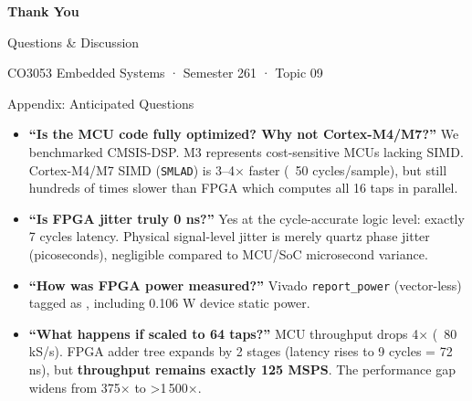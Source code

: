 \begin{frame}[plain]
\vfill\centering
{\Huge\bfseries Thank You}\par\bigskip
{\Large Questions \& Discussion}\par\bigskip
{\color{cInk2}CO3053 Embedded Systems · Semester 261 · Topic 09}
\vfill
\end{frame}

\appendix
\begin{frame}{Appendix: Anticipated Questions}
\footnotesize
\begin{itemize}\setlength{\itemsep}{2pt}
\item \textbf{``Is the MCU code fully optimized? Why not Cortex-M4/M7?''} We benchmarked CMSIS-DSP. M3 represents cost-sensitive MCUs lacking SIMD. Cortex-M4/M7 SIMD (\texttt{SMLAD}) is 3–4× faster (~50 cycles/sample), but still hundreds of times slower than FPGA which computes all 16 taps in parallel.
\item \textbf{``Is FPGA jitter truly 0 ns?''} Yes at the cycle-accurate logic level: exactly 7 cycles latency. Physical signal-level jitter is merely quartz phase jitter (picoseconds), negligible compared to MCU/SoC microsecond variance.
\item \textbf{``How was FPGA power measured?''} Vivado \texttt{report\_power} (vector-less) tagged as , including 0.106 W device static power.
\item \textbf{``What happens if scaled to 64 taps?''} MCU throughput drops 4× (~80 kS/s). FPGA adder tree expands by 2 stages (latency rises to 9 cycles = 72 ns), but \textbf{throughput remains exactly 125 MSPS}. The performance gap widens from 375× to >1\,500×.
\end{itemize}
\end{frame}

